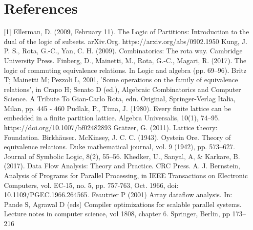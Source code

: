 \documentclass[a4paper,11pt, notitlepage]{report}
\theoremstyle{definition}
\begin{document}
\section*{References}
[1] Ellerman, D. (2009, February 11). The Logic of Partitions: Introduction to the dual of the logic of subsets. arXiv.Org. https://arxiv.org/abs/0902.1950
\newline \newline
[2]   Kung, J. P. S., Rota, G.-C., Yan, C. H. (2009). Combinatorics: The rota way. Cambridge University Press.
\newline \newline
[3]   Finberg, D., Mainetti, M., Rota, G.-C., Magari, R. (2017). The logic of commuting equivalence relations. In Logic and algebra (pp. 69–96).
\newline \newline
[4] Britz T; Mainetti M; Pezzoli L, 2001, 'Some operations on the family of equivalence relations', in Crapo H; Senato D (ed.), Algebraic Combinatorics and Computer Science. A Tribute To Gian-Carlo Rota, edn. Original, Springer-Verlag Italia, Milan, pp. 445 - 460
\newline \newline
[5] Pudlak, P., Tima, J. (1980). Every finite lattice can be embedded in a finite partition lattice. Algebra Universalis, 10(1), 74–95. https://doi.org/10.1007/bf02482893
\newline \newline
[6] Grätzer, G. (2011). Lattice theory: Foundation. Birkhäuser.
\newline \newline
[7]   McKinsey, J. C. C. (1943). Oystein Ore. Theory of equivalence relations. Duke mathematical journal, vol. 9 (1942), pp. 573–627. Journal of Symbolic Logic, 8(2), 55–56.
\newline \newline
[8] Khedker, U., Sanyal, A, \& Karkare, B. (2017). Data Flow Analysis: Theory and Practice. CRC Press.
\newline \newline
[9] A. J. Bernstein, Analysis of Programs for Parallel Processing, in IEEE Transactions on Electronic Computers, vol. EC-15, no. 5, pp. 757-763, Oct. 1966, doi: 10.1109/PGEC.1966.264565.
\newline \newline
[10] Feautrier P (2001) Array dataflow analysis. In: Pande S, Agrawal D (eds) Compiler optimizations for scalable parallel systems. Lecture notes in computer science, vol 1808, chapter 6. Springer, Berlin, pp 173–216
\end{document}
